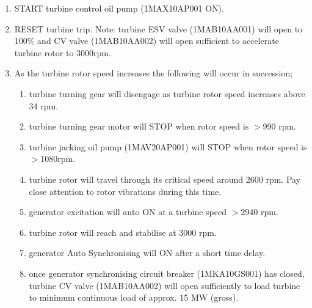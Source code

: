 \documentclass[10pt,a4paper]{article}
\begin{document}
\begin{enumerate}
\item START turbine control oil pump (1MAX10AP001 ON).
\item RESET turbine trip. Note: turbine ESV valve (1MAB10AA001) will open to 100\% and CV valve (1MAB10AA002) will open sufficient to accelerate turbine rotor to 3000rpm.
\item As the turbine rotor speed increases the following will occur in succession;
\begin{enumerate}
\item turbine turning gear will disengage as turbine rotor speed increases above 34 rpm.
\item turbine turning gear motor will STOP when rotor speed is $>$990 rpm.
\item turbine jacking oil pump (1MAV20AP001) will STOP when rotor speed is $>$1080rpm.
\item turbine rotor will travel through its critical speed around 2600 rpm. Pay close attention to rotor vibrations during this time.
\item generator excitation will auto ON at a turbine speed $>$2940 rpm.
\item turbine rotor will reach and stabilise at 3000 rpm.
\item generator Auto Synchronising will ON after a short time delay.
\item once generator synchronising circuit breaker (1MKA10GS001) has closed, turbine CV valve (1MAB10AA002) will open sufficiently to load turbine to minimum continuous load of approx. 15 MW (gross).
\end{enumerate}


\end{enumerate}
\end{document}
